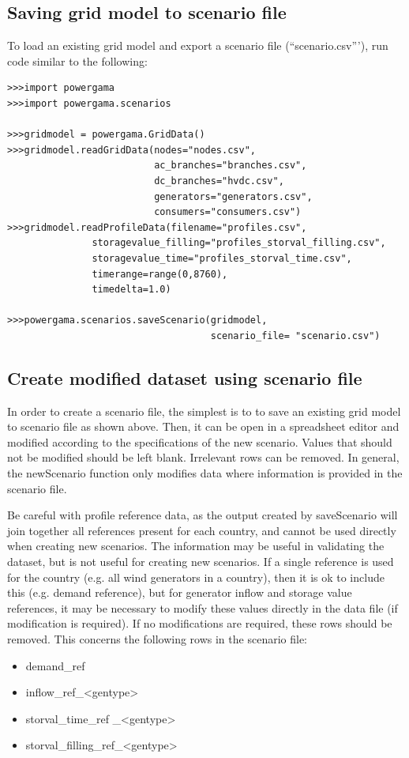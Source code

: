 \documentclass{article}
\begin{document}
\subsection{Saving grid model to scenario file}
To load an existing grid model and export a scenario file (``scenario.csv'''), run code similar to the following:

\begin{lstlisting}
>>>import powergama
>>>import powergama.scenarios

>>>gridmodel = powergama.GridData()
>>>gridmodel.readGridData(nodes="nodes.csv",
                          ac_branches="branches.csv",
                          dc_branches="hvdc.csv",
                          generators="generators.csv",
                          consumers="consumers.csv")
>>>gridmodel.readProfileData(filename="profiles.csv",
               storagevalue_filling="profiles_storval_filling.csv",
               storagevalue_time="profiles_storval_time.csv",
               timerange=range(0,8760), 
               timedelta=1.0)

>>>powergama.scenarios.saveScenario(gridmodel, 
                                    scenario_file= "scenario.csv")
\end{lstlisting}

\subsection{Create modified dataset using scenario file}
In order to create a scenario file, the simplest is to to save an existing grid model to scenario file as shown above. Then, it can be open in a spreadsheet editor and modified according to the specifications of the new scenario. Values that should not be modified should be left blank. Irrelevant rows can be removed. In general, the newScenario function only modifies data where information is provided in the scenario file.

Be careful with profile reference data, as the output created by saveScenario will join together all references present for each country, and cannot be used directly when creating new scenarios. The information may be useful in validating the dataset, but is not useful for creating new scenarios. If a single reference is used for the country (e.g. all wind generators in a country), then it is ok to include this (e.g. demand reference), but for generator inflow and storage value references, it may be necessary to modify these values directly in the data file (if modification is required). If no modifications are required, these rows should be removed. This concerns the following rows in the scenario file:
\begin{itemize}
\item demand\_ref
\item inflow\_ref\_<gentype>
\item storval\_time\_ref \_<gentype> 
\item storval\_filling\_ref\_<gentype>
\end{itemize}
 
\end{document}
